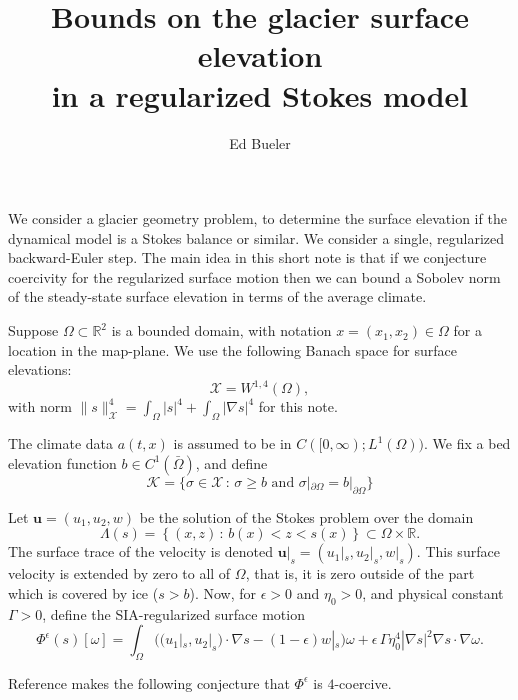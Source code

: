 \documentclass[12pt]{article}
\title{Bounds on the glacier surface elevation \\ in a regularized Stokes model}
\author{Ed Bueler}
\newcommand{\RR}{\ensuremath{\mathbb R}}
\newcommand{\bu}{\ensuremath{\mathbf{u}}}
\newcommand{\cK}{\ensuremath{\mathcal{K}}}
\newcommand{\cX}{\ensuremath{\mathcal{X}}}
\newcommand{\grad}{\ensuremath{\nabla}}
\newcommand{\eps}{\ensuremath{\epsilon}}
\begin{document}
\maketitle

We consider a glacier geometry problem, to determine the surface elevation if the dynamical model is a Stokes balance or similar.  We consider a single, regularized backward-Euler step.  The main idea in this short note is that if we conjecture coercivity for the regularized surface motion then we can bound a Sobolev norm of the steady-state surface elevation in terms of the average climate.

Suppose $\Omega\subset \RR^2$ is a bounded domain, with notation $x=(x_1,x_2)\in\Omega$ for a location in the map-plane.  We use the following Banach space for surface elevations:
\begin{equation}
\cX = W^{1,4}(\Omega), \label{eq:defineX}
\end{equation}
with norm $\|s\|_{\cX}^4 = \int_\Omega |s|^4 + \int_\Omega |\grad s|^4$ for this note.

The climate data $a(t,x)$ is assumed to be in $C([0,\infty); L^1(\Omega))$.  We fix a bed elevation function $b\in C^1(\bar\Omega)$, and define
\begin{equation}
\cK=\{\sigma\in\cX\,:\,\sigma\ge b \text{ and } \sigma|_{\partial\Omega}=b|_{\partial\Omega}\} \label{eq:defineK}
\end{equation}

Let $\bu=(u_1,u_2,w)$ be the solution of the Stokes problem over the domain
\begin{equation}
\Lambda(s) = \left\{(x,z)\,:\,b(x) < z < s(x)\right\} \subset \Omega \times \RR. \label{eq:domainfroms}
\end{equation}
The surface trace of the velocity is denoted $\bu|_s=(u_1|_s,u_2|_s,w|_s)$.  This surface velocity is extended by zero to all of $\Omega$, that is, it is zero outside of the part which is covered by ice ($s>b$).  Now, for $\eps>0$ and $\eta_0>0$, and physical constant $\Gamma>0$, define the SIA-regularized surface motion
\begin{equation}
\Phi^\eps(s)[\omega] = \int_\Omega \Big(\big(u_1|_s,u_2|_s\big) \cdot \grad s - (1-\eps) w|_s\Big) \omega + \eps\, \Gamma \eta_0^4 |\grad s|^2 \grad s \cdot \grad \omega. \label{eq:defineregularizedPhi}
\end{equation}

Reference \cite{Bueler2025} makes the following conjecture that $\Phi^\eps$ is $4$-coercive.
\end{document}
